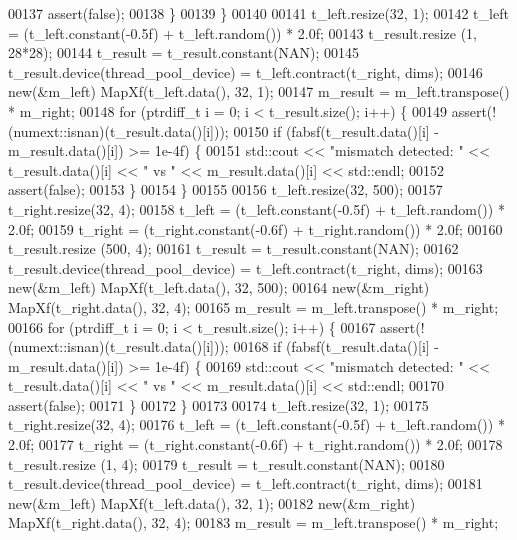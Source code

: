 \begin{DoxyCode}
00137       assert(\textcolor{keyword}{false});
00138     \}
00139   \}
00140 
00141   t\_left.resize(32, 1);
00142   t\_left = (t\_left.constant(-0.5f) + t\_left.random()) * 2.0f;
00143   t\_result.resize (1, 28*28);
00144   t\_result = t\_result.constant(NAN);
00145   t\_result.device(thread\_pool\_device) = t\_left.contract(t\_right, dims);
00146   \textcolor{keyword}{new}(&m\_left) MapXf(t\_left.data(), 32, 1);
00147   m\_result = m\_left.transpose() * m\_right;
00148   \textcolor{keywordflow}{for} (ptrdiff\_t i = 0; i < t\_result.size(); i++) \{
00149     assert(!(numext::isnan)(t\_result.data()[i]));
00150     \textcolor{keywordflow}{if} (fabsf(t\_result.data()[i] - m\_result.data()[i]) >= 1e-4f) \{
00151       std::cout << \textcolor{stringliteral}{"mismatch detected: "} << t\_result.data()[i] << \textcolor{stringliteral}{" vs "} <<  m\_result.data()[i] << 
      std::endl;
00152       assert(\textcolor{keyword}{false});
00153     \}
00154   \}
00155 
00156   t\_left.resize(32, 500);
00157   t\_right.resize(32, 4);
00158   t\_left = (t\_left.constant(-0.5f) + t\_left.random()) * 2.0f;
00159   t\_right = (t\_right.constant(-0.6f) + t\_right.random()) * 2.0f;
00160   t\_result.resize (500, 4);
00161   t\_result = t\_result.constant(NAN);
00162   t\_result.device(thread\_pool\_device) = t\_left.contract(t\_right, dims);
00163   \textcolor{keyword}{new}(&m\_left) MapXf(t\_left.data(), 32, 500);
00164   \textcolor{keyword}{new}(&m\_right) MapXf(t\_right.data(), 32, 4);
00165   m\_result = m\_left.transpose() * m\_right;
00166   \textcolor{keywordflow}{for} (ptrdiff\_t i = 0; i < t\_result.size(); i++) \{
00167     assert(!(numext::isnan)(t\_result.data()[i]));
00168     \textcolor{keywordflow}{if} (fabsf(t\_result.data()[i] - m\_result.data()[i]) >= 1e-4f) \{
00169       std::cout << \textcolor{stringliteral}{"mismatch detected: "} << t\_result.data()[i] << \textcolor{stringliteral}{" vs "} <<  m\_result.data()[i] << 
      std::endl;
00170       assert(\textcolor{keyword}{false});
00171     \}
00172   \}
00173 
00174   t\_left.resize(32, 1);
00175   t\_right.resize(32, 4);
00176   t\_left = (t\_left.constant(-0.5f) + t\_left.random()) * 2.0f;
00177   t\_right = (t\_right.constant(-0.6f) + t\_right.random()) * 2.0f;
00178   t\_result.resize (1, 4);
00179   t\_result = t\_result.constant(NAN);
00180   t\_result.device(thread\_pool\_device) = t\_left.contract(t\_right, dims);
00181   \textcolor{keyword}{new}(&m\_left) MapXf(t\_left.data(), 32, 1);
00182   \textcolor{keyword}{new}(&m\_right) MapXf(t\_right.data(), 32, 4);
00183   m\_result = m\_left.transpose() * m\_right;

\end{DoxyCode}
